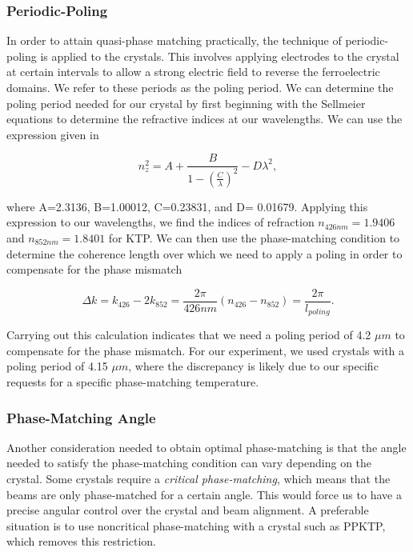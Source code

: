 \subsubsection{Periodic-Poling}
\label{periodic_poling} 

In order to attain quasi-phase matching practically, the technique of
periodic-poling is applied to the crystals.  This involves applying electrodes
to the crystal at certain intervals to allow a strong electric field to reverse
the ferroelectric domains.  We refer to these periods as the poling period.  We
can determine the poling period needed for our crystal by first beginning with
the Sellmeier equations to determine the refractive indices at our wavelengths.  We can use the expression given in \cite{Vanherzeele}


\begin{equation}
  \label{eq:sellemier}
  n^2_z = A + \frac{B}{1-(\frac{C}{\lambda})^2 }  - D \lambda^2,
\end{equation}

\noindent
where A=2.3136, B=1.00012, C=0.23831, and D= 0.01679.  Applying this expression to our wavelengths, we find the indices of refraction $n_{426 nm} = 1.9406$ and $n_{852 nm} = 1.8401$ for KTP.  We can then use the phase-matching condition to determine the coherence length over which we need to apply a poling in order to compensate for the phase mismatch 

\begin{equation}
  \label{eq:pp_mismatch}
  \Delta k= k _{426} - 2k_{852} = \frac{2 \pi}{426 nm } (n_{426} - n_{852}) = \frac{2 \pi}{l_{poling}} .
\end{equation}

\noindent
Carrying out this calculation indicates that we need a poling period of 4.2 $\mu m$ to compensate for the phase mismatch.  For our experiment, we used crystals with a poling period of 4.15 $\mu m$, where the discrepancy is likely due to our specific requests for a specific phase-matching temperature.

\subsubsection{Phase-Matching Angle}
\label{phase_matching_angle} 

Another consideration needed to obtain optimal phase-matching is that the angle needed to satisfy the phase-matching condition can vary depending on the crystal.  Some crystals require a \emph{critical phase-matching}, which means that the beams are only phase-matched for a certain angle.  This would force us to have a precise angular control over the crystal and beam alignment.  A preferable situation is to use noncritical phase-matching with a crystal such as PPKTP, which removes this restriction.  



